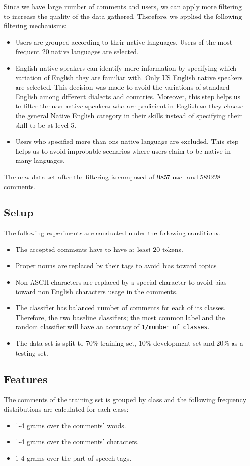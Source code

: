 \documentclass[11pt]{article}
\begin{document}
Since we have large number of comments and users, we can apply more filtering to
increase the quality of the data gathered. Therefore, we applied the following filtering mechanisms:
\begin{itemize}
\item Users are grouped according to their native languages. Users of the most frequent 20 native languages are selected.
\item English native speakers can identify more information by specifying which
variation of English they are familiar with. Only US English native speakers are
selected. This decision was made to avoid the variations of standard English
among different dialects and countries. Moreover, this step helps us to filter
the non native speakers who are proficient in English so they choose the general
Native English category in their skills instead of specifying their skill to be
at level 5.
\item Users who specified more than one native language are excluded. This step
helps us to avoid improbable scenarios where users claim to be native in many
languages.
\end{itemize}

The new data set after the filtering is composed of 9857 user and 589228 comments.

\subsection{Setup}
The following experiments are conducted under the following conditions:
\begin{itemize}
\item The accepted comments have to have at least 20 tokens.
\item Proper nouns are replaced by their tags to avoid bias toward topics.
\item Non ASCII characters are replaced by a special character to avoid bias toward non English characters usage in the comments.
\item The classifier has balanced number of comments for each of its classes. Therefore, the two baseline classifiers; the most common label and the random classifier will have an accuracy of \verb+1/number of classes+.
\item The data set is split to 70\% training set, 10\% development set and 20\%
as a testing set.
\end{itemize}

\subsection{Features}
The comments of the training set is grouped by class and the following frequency distributions are calculated for each class:
\begin{itemize}
\item 1-4 grams over the comments' words.
\item 1-4 grams over the comments' characters.
\item 1-4 grams over the part of speech tags.
\end{itemize}
\end{document}
